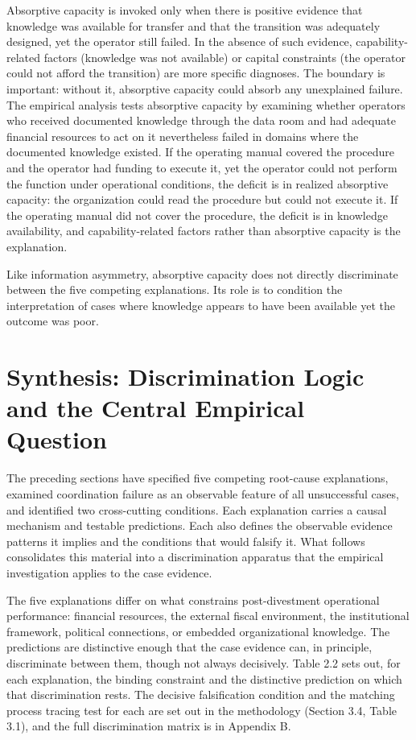 Absorptive capacity is invoked only when there is positive evidence that
knowledge was available for transfer and that the transition was
adequately designed, yet the operator still failed. In the absence of
such evidence, capability-related factors (knowledge was not available)
or capital constraints (the operator could not afford the transition)
are more specific diagnoses. The boundary is important: without it,
absorptive capacity could absorb any unexplained failure. The empirical
analysis tests absorptive capacity by examining whether operators who
received documented knowledge through the data room and had adequate
financial resources to act on it nevertheless failed in domains where
the documented knowledge existed. If the operating manual covered the
procedure and the operator had funding to execute it, yet the operator
could not perform the function under operational conditions, the deficit
is in realized absorptive capacity: the organization could read the
procedure but could not execute it. If the operating manual did not
cover the procedure, the deficit is in knowledge availability, and
capability-related factors rather than absorptive capacity is the
explanation.

Like information asymmetry, absorptive capacity does not directly
discriminate between the five competing explanations. Its role is to
condition the interpretation of cases where knowledge appears to have
been available yet the outcome was poor.

\hypertarget{synthesis-discrimination-logic-and-the-central-empirical-question}{%
\section{Synthesis: Discrimination Logic and the Central Empirical
Question}\label{synthesis-discrimination-logic-and-the-central-empirical-question}}

The preceding sections have specified five competing root-cause
explanations, examined coordination failure as an observable feature of
all unsuccessful cases, and identified two cross-cutting conditions.
Each explanation carries a causal mechanism and testable predictions.
Each also defines the observable evidence patterns it implies and the
conditions that would falsify it. What follows consolidates this
material into a discrimination apparatus that the empirical
investigation applies to the case evidence.

The five explanations differ on what constrains post-divestment
operational performance: financial resources, the external fiscal
environment, the institutional framework, political connections, or
embedded organizational knowledge. The predictions are distinctive
enough that the case evidence can, in principle, discriminate between
them, though not always decisively. Table 2.2 sets out, for each
explanation, the binding constraint and the distinctive prediction on
which that discrimination rests. The decisive falsification condition
and the matching process tracing test for each are set out in the
methodology (Section 3.4, Table 3.1), and the full discrimination matrix
is in Appendix B.


